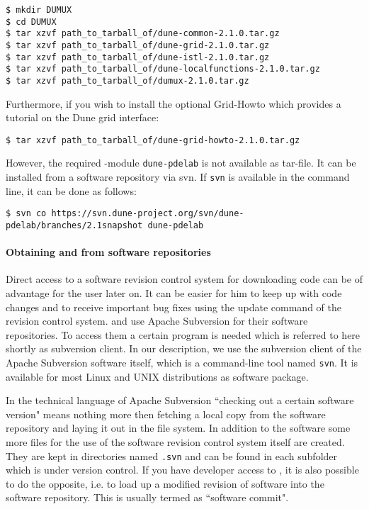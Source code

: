\begin{lstlisting}[style=Bash]
$ mkdir DUMUX
$ cd DUMUX
$ tar xzvf path_to_tarball_of/dune-common-2.1.0.tar.gz 
$ tar xzvf path_to_tarball_of/dune-grid-2.1.0.tar.gz 
$ tar xzvf path_to_tarball_of/dune-istl-2.1.0.tar.gz 
$ tar xzvf path_to_tarball_of/dune-localfunctions-2.1.0.tar.gz 
$ tar xzvf path_to_tarball_of/dumux-2.1.0.tar.gz
\end{lstlisting}

Furthermore, if you wish to install the optional \Dune Grid-Howto which provides a tutorial on the Dune grid interface:

\begin{lstlisting}[style=Bash]
$ tar xzvf path_to_tarball_of/dune-grid-howto-2.1.0.tar.gz
\end{lstlisting}

However, the required \Dune-module \texttt{dune-pdelab} is not available as tar-file.
It can be installed from a software repository via svn.
If \texttt{svn} is available in the command line, it can be done as follows: 

\begin{lstlisting}[style=Bash]
$ svn co https://svn.dune-project.org/svn/dune-pdelab/branches/2.1snapshot dune-pdelab
\end{lstlisting}

\paragraph{Obtaining \Dune and \Dumux from software repositories} 

Direct access to a software revision control system for downloading code can be of advantage for the user later on. 
It can be easier for him to keep up with code changes and to receive important bug fixes using the update command of the revision control system. 
\Dune and \Dumux use Apache Subversion for their software repositories. To access them a certain program is needed which is referred to here shortly as subversion client. 
In our description, we use the subversion client of the Apache Subversion software itself, which is a command-line tool named \texttt{svn}. 
It is available for most Linux and UNIX distributions as software package.

In the technical language of Apache Subversion ``checking out a certain software version" means nothing more then fetching 
a local copy from the software repository and laying it out in the file system.  In addition to the software some more files for the use of the software revision control system itself are created. They are kept in directories named \texttt{.svn} and can be found in each subfolder which is under version control.
If you have developer access to \Dumux, it is also possible to do the opposite, i.e. to load up a modified revision of software into the software repository. This is usually termed as ``software commit".

